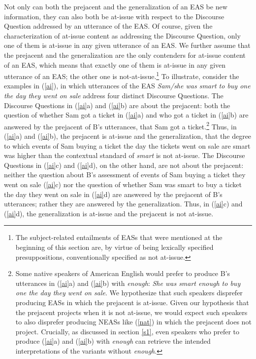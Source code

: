 \documentclass[11pt,fleqn]{article}
\newcommand{\6}{\mbox{$[\hspace*{-.6mm}[$}}
\newcommand{\9}{\mbox{$]\hspace*{-.6mm}]$}}
\begin{document}
Not only can both the prejacent and the generalization of an EAS be new information, they can also both be at-issue with respect to the Discourse Question addressed by an utterance of the EAS. Of course, given the characterization of at-issue content as addressing the Discourse Question, only one of them is at-issue in any given utterance of an EAS. We further assume that the prejacent and the generalization are the only contenders for at-issue content of an EAS, which means that exactly one of them is at-issue in any given utterance of an EAS; the other one is not-at-issue.\footnote{The subject-related entailments of EASs that were mentioned at the beginning of this section are, by virtue of being lexically specified presuppositions, conventionally specified as not at-issue.} To illustrate, consider the examples in (\ref{ai}), in which utterances of the EAS {\em Sam/she was smart to buy one the day they went on sale} address four distinct Discourse Questions. The Discourse Questions in (\ref{ai}a) and (\ref{ai}b) are about the prejacent: both the question of whether Sam got a ticket in (\ref{ai}a) and who got a ticket in (\ref{ai}b) are answered by the prejacent of B's utterances, that Sam got a ticket.\footnote{Some native speakers of American English would prefer to produce B's utterances in (\ref{ai}a) and (\ref{ai}b) with {\em enough}: {\em She was smart enough to buy one the day they went on sale}. We hypothesize that such speakers disprefer producing EASs in which the prejacent is at-issue. Given our hypothesis that the prejacent projects when it is not at-issue, we would expect such speakers to also disprefer producing NEASs like (\ref{nat}) in which the prejacent does not project. Crucially, as discussed in section \ref{s1}, even speakers who prefer to produce (\ref{ai}a) and (\ref{ai}b) with {\em enough} can retrieve the intended interpretations of the variants without {\em enough}.} Thus, in (\ref{ai}a) and (\ref{ai}b), the prejacent is at-issue and the generalization, that the degree to which events of Sam buying a ticket the day the tickets went on sale are smart was higher than the contextual standard of {\em smart} is not at-issue. The Discourse Questions in (\ref{ai}c) and (\ref{ai}d), on the other hand, are not about the prejacent:  neither the question about B's assessment of events of Sam buying a ticket they went on sale (\ref{ai}c) nor the question of whether Sam was smart to buy a ticket the day they went on sale in (\ref{ai}d) are answered by the prejacent of B's utterances; rather they are answered by the generalization. Thus, in (\ref{ai}c) and (\ref{ai}d), the generalization is at-issue and the prejacent is not at-issue.
\end{document}

